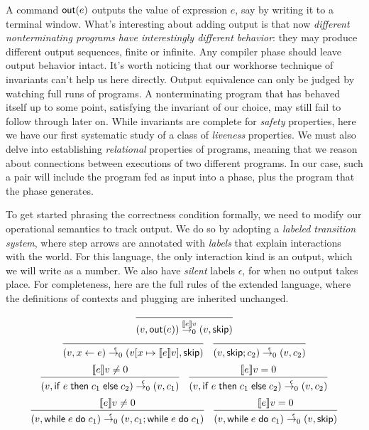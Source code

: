 \documentclass{amsbook}
\theoremstyle{definition}
\theoremstyle{remark}
\numberwithin{section}{chapter}
\numberwithin{equation}{chapter}
\begin{document}
A command $\mathsf{out}(e)$ outputs the value of expression $e$, say by writing it to a terminal window.
What's interesting about adding output is that now \emph{different nonterminating programs have interestingly different behavior}: they may produce different output sequences, finite or infinite.
Any compiler phase should leave output behavior intact.
It's worth noticing that our workhorse technique of invariants can't help us here directly.
Output equivalence can only be judged by watching full runs of programs.
A nonterminating program that has behaved itself up to some point, satisfying the invariant of our choice, may still fail to follow through later on.
While invariants are complete for \emph{safety} properties, here we have our first systematic study of a class of \emph{liveness} properties.
We must also delve into establishing \emph{relational} properties of programs, meaning that we reason about connections between executions of two different programs.
In our case, such a pair will include the program fed as input into a phase, plus the program that the phase generates.

\newcommand{\silent}[0]{\epsilon}
\newcommand{\smallstepol}[3]{#1 \stackrel{#2}{\to_0} #3}
\newcommand{\smallstepcl}[3]{#1 \stackrel{#2}{\to_\mathsf{c}} #3}

To get started phrasing the correctness condition formally, we need to modify our operational semantics to track output.
We do so by adopting a \emph{labeled transition system}, where step arrows are annotated with \emph{labels} that explain interactions with the world.
For this language, the only interaction kind is an output, which we will write as a number.
We also have \emph{silent} labels $\silent$, for when no output takes place.
For completeness, here are the full rules of the extended language, where the definitions of contexts and plugging are inherited unchanged.

$$\infer{\smallstepol{(v, \outp{e})}{\denote{e}v}{(v, \skipe)}}{}$$
$$\infer{\smallstepol{(v, \assign{x}{e})}{\silent}{(\mupd{v}{x}{\denote{e}v}, \skipe)}}{}
\quad \infer{\smallstepol{(v, \skipe; c_2)}{\silent}{(v, c_2)}}{}$$
$$\infer{\smallstepol{(v, \ifte{e}{c_1}{c_2})}{\silent}{(v, c_1)}}{
  \denote{e}v \neq 0
}
\quad \infer{\smallstepol{(v, \ifte{e}{c_1}{c_2})}{\silent}{(v, c_2)}}{
  \denote{e}v = 0
}$$
$$\infer{\smallstepol{(v, \while{e}{c_1})}{\silent}{(v, c_1; \while{e}{c_1})}}{
  \denote{e}v \neq 0
}
\quad \infer{\smallstepol{(v, \while{e}{c_1})}{\silent}{(v, \skipe)}}{
  \denote{e}v = 0
}$$
\end{document}
